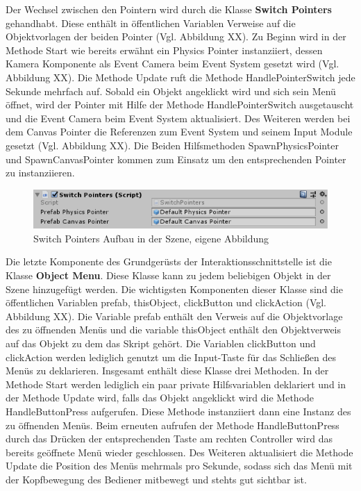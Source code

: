 \newline
Der Wechsel zwischen den Pointern wird durch die Klasse \textbf{Switch Pointers} gehandhabt. Diese enthält in öffentlichen Variablen Verweise auf die Objektvorlagen der beiden Pointer (Vgl. Abbildung XX).
\newline
Zu Beginn wird in der Methode Start wie bereits erwähnt ein Physics Pointer instanziiert, dessen Kamera Komponente als Event Camera beim Event System gesetzt wird (Vgl. Abbildung XX). Die Methode Update ruft die Methode HandlePointerSwitch jede Sekunde mehrfach auf. Sobald ein Objekt angeklickt wird und sich sein Menü öffnet, wird der Pointer mit Hilfe der Methode HandlePointerSwitch ausgetauscht und die Event Camera beim Event System aktualisiert. Des Weiteren werden bei dem Canvas Pointer die Referenzen zum Event System und seinem Input Module gesetzt (Vgl. Abbildung XX). Die Beiden Hilfsmethoden SpawnPhysicsPointer und SpawnCanvasPointer kommen zum Einsatz um den entsprechenden Pointer zu instanziieren.
\begin{figure}[h]
	\centering
	\includegraphics[width=0.5\linewidth]{Bilder/A45_SwitchPointer}
	\caption{Switch Pointers Aufbau in der Szene, eigene Abbildung}
	\label{fig:SwitchPointer}
\end{figure}
\newline
Die letzte Komponente des Grundgerüsts der Interaktionsschnittstelle ist die Klasse \textbf{Object Menu}. Diese Klasse kann zu jedem beliebigen Objekt in der Szene hinzugefügt werden. Die wichtigsten Komponenten dieser Klasse sind die öffentlichen Variablen prefab, thisObject, clickButton und clickAction (Vgl. Abbildung XX). Die Variable prefab enthält den Verweis auf die Objektvorlage des zu öffnenden Menüs und die variable thisObject enthält den Objektverweis auf das Objekt zu dem das Skript gehört. Die Variablen clickButton und clickAction werden lediglich genutzt um die Input-Taste für das Schließen des Menüs zu deklarieren.
\newline
Insgesamt enthält diese Klasse drei Methoden. In der Methode Start werden lediglich ein paar private Hilfsvariablen deklariert und in der Methode Update wird, falls das Objekt angeklickt wird die Methode HandleButtonPress aufgerufen. Diese Methode instanziiert dann eine Instanz des zu öffnenden Menüs. Beim erneuten aufrufen der Methode HandleButtonPress durch das Drücken der entsprechenden Taste am rechten Controller wird das bereits geöffnete Menü wieder geschlossen. Des Weiteren aktualisiert die Methode Update die Position des Menüs mehrmals pro Sekunde, sodass sich das Menü mit der Kopfbewegung des Bediener mitbewegt und stehts gut sichtbar ist.
